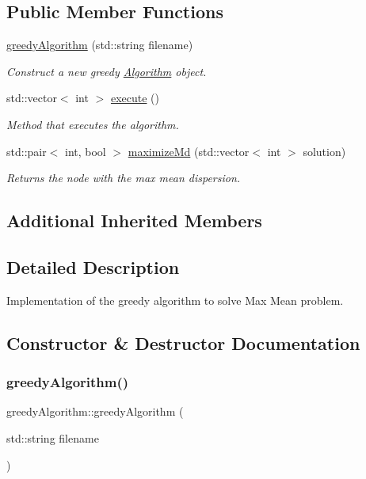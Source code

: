 \subsection*{Public Member Functions}
\begin{DoxyCompactItemize}
\item 
\hyperlink{classgreedyAlgorithm_acd4c3a073c8ed2e93bbf402363ebd71d}{greedy\+Algorithm} (std\+::string filename)
\begin{DoxyCompactList}\small\item\em Construct a new greedy \hyperlink{classAlgorithm}{Algorithm} object. \end{DoxyCompactList}\item 
std\+::vector$<$ int $>$ \hyperlink{classgreedyAlgorithm_a37c81600b24a32ae25b6f0eeab643a7a}{execute} ()
\begin{DoxyCompactList}\small\item\em Method that executes the algorithm. \end{DoxyCompactList}\item 
std\+::pair$<$ int, bool $>$ \hyperlink{classgreedyAlgorithm_a4968e1371d2fdfb1b1b6f24b57dd1f07}{maximize\+Md} (std\+::vector$<$ int $>$ solution)
\begin{DoxyCompactList}\small\item\em Returns the node with the max mean dispersion. \end{DoxyCompactList}\end{DoxyCompactItemize}
\subsection*{Additional Inherited Members}


\subsection{Detailed Description}
Implementation of the greedy algorithm to solve Max Mean problem. 

\subsection{Constructor \& Destructor Documentation}
\mbox{\label{classgreedyAlgorithm_acd4c3a073c8ed2e93bbf402363ebd71d}} 
\subsubsection{\texorpdfstring{greedy\+Algorithm()}{greedyAlgorithm()}}
{\footnotesize\ttfamily greedy\+Algorithm\+::greedy\+Algorithm (\begin{DoxyParamCaption}\item[{std\+::string}]{filename }\end{DoxyParamCaption})\hspace{0.3cm}{\ttfamily [inline]}}



